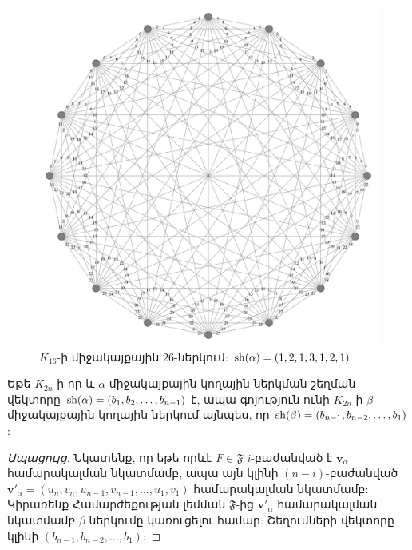 \begin{hide}
\begin{figure}[t!]
\centering
\includegraphics[width=\textwidth]{figures/K_16-26.pdf}
\caption{$K_{16}$-ի միջակայքային $26$-ներկում: ${\rm sh}(\alpha) = (1,2,1,3,1,2,1)$}
\label{f2_K16}
\end{figure}

\begin{lemma}
\label{lReverse}
Եթե $K_{2n}$-ի որ և $\alpha$ միջակայքային կողային ներկման շեղման վեկտորը ${\rm sh}(\alpha) = (b_1,b_2,\ldots, b_{n-1})$ է, ապա գոյություն ունի $K_{2n}$-ի $\beta$ միջակայքային կողային ներկում այնպես, որ ${\rm sh}(\beta) = (b_{n-1}, b_{n-2}, \ldots, b_1)$:
\end{lemma}
\begin{proof}[Ապացույց]
Նկատենք, որ եթե որևէ $F \in \mathfrak{F}$ $i$-բաժանված է $\mathbf{v}_\alpha$ համարակալման նկատմամբ, ապա այն կլինի $(n-i)$-բաժանված $\mathbf{v}'_\alpha = \left(u_n,v_n,u_{n-1},v_{n-1},\ldots,u_1,v_1\right)$ համարակալման նկատմամբ: 
Կիրառենք Համարժեքության լեմման $\mathfrak{F}$-ից $\mathbf{v}'_\alpha$ համարակալման նկատմամբ $\beta$ ներկումը կառուցելու համար: Շեղումների վեկտորը կլինի $(b_{n-1}, b_{n-2}, \ldots, b_1)$:
\end{proof}


\end{hide}
